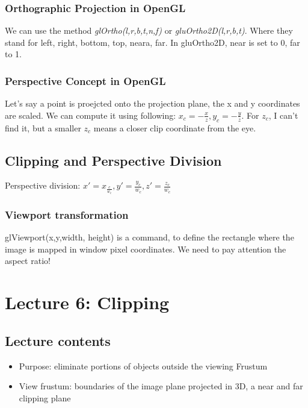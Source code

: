 \documentclass[11pt]{article}
\begin{document}
\subsubsection*{Orthographic Projection in OpenGL}
We can use the method \textit{glOrtho(l,r,b,t,n,f)} or \textit{gluOrtho2D(l,r,b,t)}. Where they stand for left, right, bottom, top, neara, far. In gluOrtho2D, near is set to 0, far to 1.

\subsubsection*{Perspective Concept in OpenGL}
Let's say a point is proejcted onto the projection plane, the x and y coordinates are scaled. We can compute it using following: $x_c = -\frac{x}{z}, y_c = - \frac{y}{z}$. For $z_c$, I can't find it, but a smaller $z_c$ means a closer clip coordinate from the eye.    

\subsection{Clipping and Perspective Division}
Perspective division: $x' = x_\frac{c}{w_c}, y' = \frac{y_c}{w_c}, z' = \frac{z_c}{w_c}$ 


\subsubsection*{Viewport transformation}
glViewport(x,y,width, height) is a command, to define the rectangle where the image is mapped in window pixel coordinates. 
We need to pay attention the aspect ratio!




\section{Lecture 6: Clipping}
\subsection*{Lecture contents}
\begin{itemize}
    \item Purpose: eliminate portions of objects outside the viewing Frustum
    \item View frustum: boundaries of the image plane projected in 3D, a near and far clipping plane
\end{itemize}
\end{document}

